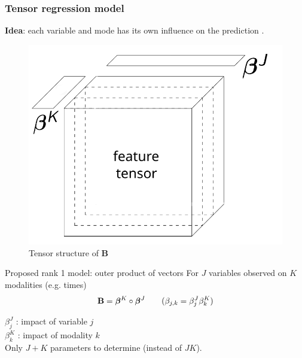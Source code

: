 \documentclass{beamer}
\begin{document}
\begin{frame}
    \frametitle{Tensor regression model}
    \textbf{Idea}: each variable and mode has its own influence on the prediction \cite{multi_rank_1}.\\[10 pt]
    \begin{overprint}
    \begin{figure}
        \centering
        \includegraphics[scale = 0.3]{images/beta_tens.png}
        \caption{Tensor structure of $\mathbf{B}$}
    \end{figure}
    \begin{block}{Proposed rank 1 model: outer product of vectors}
    For $J$ variables observed on $K$ modalities (e.g. times)
    $$ \mathbf{B} = \bm{\beta}^K \circ \bm{\beta}^J \hspace{0.7 cm}  (\beta_{j,k} = \beta_j^J\beta_{k}^{K})$$
    \end{block}
    $\beta_j^J$ : impact of variable $j$ \\[5 pt]
    $\beta_k^K$ : impact of modality $k$\\[10 pt]
    Only $J+K$ parameters to determine (instead of $JK$).
    
\end{overprint}
\end{frame}
\end{document}
